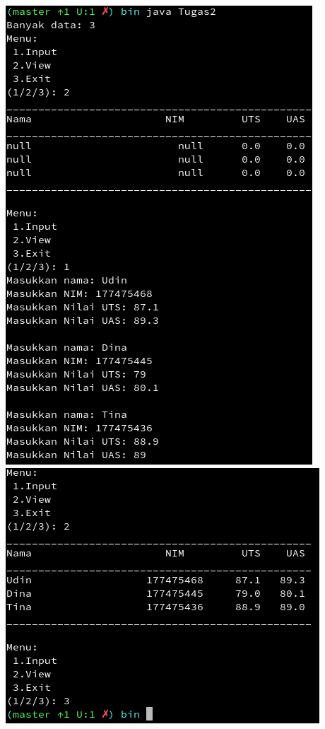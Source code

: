 \documentclass[a4paper,12pt]{article}
\begin{document}
\begin{center}
    \includegraphics[scale=.7]{Tugas2a.png} 
    \includegraphics[scale=.7]{Tugas2b.png} 
\end{center}
\end{document}
